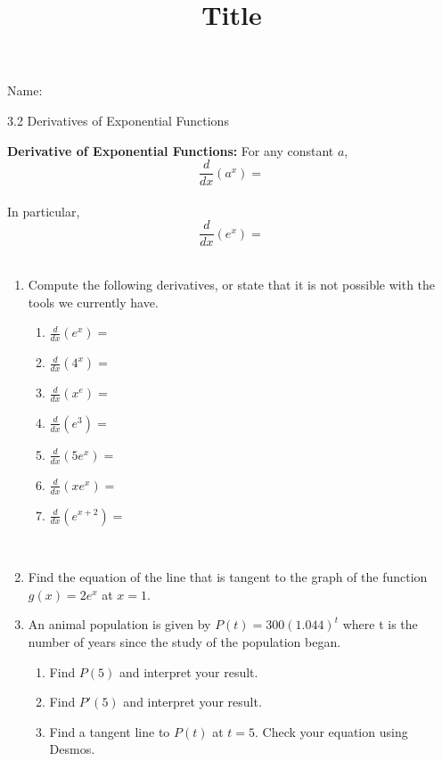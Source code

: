 \documentclass[12pt]{article}
\title{Title}
\begin{document}

 Name:
 \begin{center}\large{3.2 Derivatives of Exponential Functions}\end{center}


\begin{tcolorbox}

\textbf{Derivative of Exponential Functions:} For any constant $a$, \\ $$\frac{d}{dx}\left(a^x\right)=$$\\In particular, $$\frac{d}{dx}\left(e^x\right)=$$\\ 


\end{tcolorbox}

\begin{enumerate}
\item Compute the following derivatives, or state that it is not possible with the tools we currently have.

	\begin{multicols}{2}
	\begin{enumerate}[itemsep=1.6cm]
	\item $\displaystyle \frac{d}{dx}\left(e^x\right)=$

	\item $\displaystyle \frac{d}{dx}\left(4^x\right)=$

	\item $\displaystyle \frac{d}{dx}\left(x^e\right)=$

	\item $\displaystyle \frac{d}{dx}\left(e^3\right)=$

	\item $\displaystyle \frac{d}{dx}\left(5e^x\right)=$

	\item $\displaystyle \frac{d}{dx}\left(xe^x\right)=$

	\item $\displaystyle \frac{d}{dx}\left(e^{x+2}\right)=$



	\end{enumerate}
	\end{multicols}
\newpage
~
	\item Find the equation of the line that is tangent to the graph of the function $\displaystyle g(x)=2e^x$ at $x=1$.
		\vfill
	\item An animal population is given by $P(t)=300(1.044)^t$ where t is the number of years since the study of the population began. 
	\begin{enumerate}
	\item Find $P(5)$ and interpret your result.
	\vfill
	\item Find $P'(5)$ and interpret your result.
	\vfill
	\item Find a tangent line to $P(t)$ at $t=5$. Check your equation using Desmos.
	\vfill
	\end{enumerate}
\end{enumerate}
\end{document}
